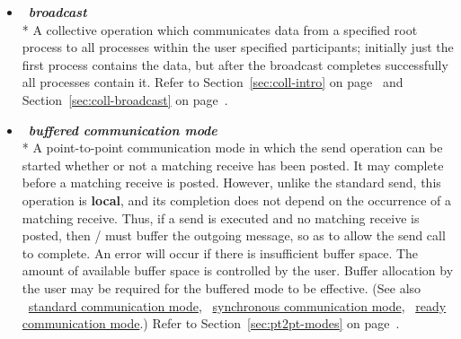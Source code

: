 \begin{itemize}
\label{glossary:broadcast}
\item  ~\hypertarget{glossary:broadcast}{\emph{\textbf{broadcast}}} \\*
A collective operation which communicates data from a specified root process to all processes within the 
user specified participants;
initially just the first process contains the data, but after the
broadcast completes successfully all processes contain it.
Refer to Section~\ref{sec:coll-intro} on page~\pageref{sec:coll-intro}
and Section~\ref{sec:coll-broadcast} on page~\pageref{sec:coll-broadcast}.

\label{glossary:buffered_communication_mode}
\item  ~\hypertarget{glossary:buffered_communication_mode}{\emph{\textbf{buffered communication mode}}} \\*
A point-to-point communication mode in which the
send operation can be started whether or not a
matching receive has been posted.
It may complete before a matching receive is posted.  However, unlike
the standard send, this operation is {\bf local}, and its
completion does not depend on the occurrence of a matching receive.  Thus, if a
send is executed and no matching receive is posted, then \MPI/ must buffer the
outgoing message, so as to allow the send call to complete.   An error will
occur if there is insufficient buffer space.   The amount of available buffer
space is controlled by the user.
Buffer allocation by the user may be required for the buffered mode to be
effective. 
(See also ~\hyperlink{glossary:standard_communication_mode}{standard communication mode}, 
~\hyperlink{glossary:synchronous_communication_mode}{synchronous communication mode},
~\hyperlink{glossary:ready_communication_mode}{ready communication mode}.)
Refer to Section~\ref{sec:pt2pt-modes} on page~\pageref{sec:pt2pt-modes}.


\end{itemize}

